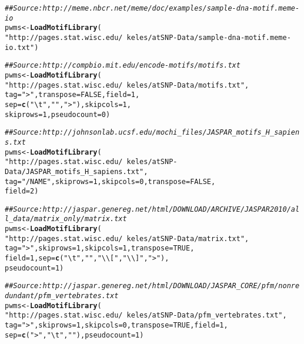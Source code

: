 \documentclass[a4paper,10pt]{article}\usepackage[]{graphicx}\usepackage[]{color}
\makeatletter
\newcommand{\hlnum}[1]{\textcolor[rgb]{0.686,0.059,0.569}{#1}}%
\newcommand{\hlstr}[1]{\textcolor[rgb]{0.192,0.494,0.8}{#1}}%
\newcommand{\hlcom}[1]{\textcolor[rgb]{0.678,0.584,0.686}{\textit{#1}}}%
\newcommand{\hlstd}[1]{\textcolor[rgb]{0.345,0.345,0.345}{#1}}%
\newcommand{\hlkwb}[1]{\textcolor[rgb]{0.69,0.353,0.396}{#1}}%
\newcommand{\hlkwc}[1]{\textcolor[rgb]{0.333,0.667,0.333}{#1}}%
\newcommand{\hlkwd}[1]{\textcolor[rgb]{0.737,0.353,0.396}{\textbf{#1}}}%
\newenvironment{kframe}{%
 \def\at@end@of@kframe{}%
 \ifinner\ifhmode%
  \def\at@end@of@kframe{\end{minipage}}%
  \begin{minipage}{\columnwidth}%
 \fi\fi%
 \def\FrameCommand##1{\hskip\@totalleftmargin \hskip-\fboxsep
 \colorbox{shadecolor}{##1}\hskip-\fboxsep
     \hskip-\linewidth \hskip-\@totalleftmargin \hskip\columnwidth}%
 \MakeFramed {\advance\hsize-\width
   \@totalleftmargin\z@ \linewidth\hsize
   \@setminipage}}%
 {\par\unskip\endMakeFramed%
 \at@end@of@kframe}
\newenvironment{knitrout}{}{} %
\makeatother
\begin{document}
\begin{knitrout}
\color{fgcolor}\begin{kframe}
\begin{alltt}
\hlcom{## Source: http://meme.nbcr.net/meme/doc/examples/sample-dna-motif.meme-io}
\hlstd{pwms} \hlkwb{<-} \hlkwd{LoadMotifLibrary}\hlstd{(}
 \hlstr{"http://pages.stat.wisc.edu/~keles/atSNP-Data/sample-dna-motif.meme-io.txt"}\hlstd{)}

\hlcom{## Source: http://compbio.mit.edu/encode-motifs/motifs.txt}
\hlstd{pwms} \hlkwb{<-} \hlkwd{LoadMotifLibrary}\hlstd{(}
 \hlstr{"http://pages.stat.wisc.edu/~keles/atSNP-Data/motifs.txt"}\hlstd{,}
 \hlkwc{tag} \hlstd{=} \hlstr{">"}\hlstd{,} \hlkwc{transpose} \hlstd{=} \hlnum{FALSE}\hlstd{,} \hlkwc{field} \hlstd{=} \hlnum{1}\hlstd{,}
 \hlkwc{sep} \hlstd{=} \hlkwd{c}\hlstd{(}\hlstr{"\textbackslash{}t"}\hlstd{,} \hlstr{" "}\hlstd{,} \hlstr{">"}\hlstd{),} \hlkwc{skipcols} \hlstd{=} \hlnum{1}\hlstd{,}
 \hlkwc{skiprows} \hlstd{=} \hlnum{1}\hlstd{,} \hlkwc{pseudocount} \hlstd{=} \hlnum{0}\hlstd{)}

\hlcom{## Source: http://johnsonlab.ucsf.edu/mochi_files/JASPAR_motifs_H_sapiens.txt}
\hlstd{pwms} \hlkwb{<-} \hlkwd{LoadMotifLibrary}\hlstd{(}
 \hlstr{"http://pages.stat.wisc.edu/~keles/atSNP-Data/JASPAR_motifs_H_sapiens.txt"}\hlstd{,}
 \hlkwc{tag} \hlstd{=} \hlstr{"/NAME"}\hlstd{,}\hlkwc{skiprows} \hlstd{=} \hlnum{1}\hlstd{,} \hlkwc{skipcols} \hlstd{=} \hlnum{0}\hlstd{,} \hlkwc{transpose} \hlstd{=} \hlnum{FALSE}\hlstd{,}
 \hlkwc{field} \hlstd{=} \hlnum{2}\hlstd{)}

\hlcom{## Source: http://jaspar.genereg.net/html/DOWNLOAD/ARCHIVE/JASPAR2010/all_data/matrix_only/matrix.txt}
\hlstd{pwms} \hlkwb{<-} \hlkwd{LoadMotifLibrary}\hlstd{(}
 \hlstr{"http://pages.stat.wisc.edu/~keles/atSNP-Data/matrix.txt"}\hlstd{,}
 \hlkwc{tag} \hlstd{=} \hlstr{">"}\hlstd{,} \hlkwc{skiprows} \hlstd{=} \hlnum{1}\hlstd{,} \hlkwc{skipcols} \hlstd{=} \hlnum{1}\hlstd{,} \hlkwc{transpose} \hlstd{=} \hlnum{TRUE}\hlstd{,}
 \hlkwc{field} \hlstd{=} \hlnum{1}\hlstd{,} \hlkwc{sep} \hlstd{=} \hlkwd{c}\hlstd{(}\hlstr{"\textbackslash{}t"}\hlstd{,} \hlstr{" "}\hlstd{,} \hlstr{"\textbackslash{}\textbackslash{}["}\hlstd{,} \hlstr{"\textbackslash{}\textbackslash{}]"}\hlstd{,} \hlstr{">"}\hlstd{),}
 \hlkwc{pseudocount} \hlstd{=} \hlnum{1}\hlstd{)}

\hlcom{## Source: http://jaspar.genereg.net/html/DOWNLOAD/JASPAR_CORE/pfm/nonredundant/pfm_vertebrates.txt}
\hlstd{pwms} \hlkwb{<-} \hlkwd{LoadMotifLibrary}\hlstd{(}
 \hlstr{"http://pages.stat.wisc.edu/~keles/atSNP-Data/pfm_vertebrates.txt"}\hlstd{,}
 \hlkwc{tag} \hlstd{=} \hlstr{">"}\hlstd{,} \hlkwc{skiprows} \hlstd{=} \hlnum{1}\hlstd{,} \hlkwc{skipcols} \hlstd{=} \hlnum{0}\hlstd{,} \hlkwc{transpose} \hlstd{=} \hlnum{TRUE}\hlstd{,} \hlkwc{field} \hlstd{=} \hlnum{1}\hlstd{,}
 \hlkwc{sep} \hlstd{=} \hlkwd{c}\hlstd{(}\hlstr{">"}\hlstd{,} \hlstr{"\textbackslash{}t"}\hlstd{,} \hlstr{" "}\hlstd{),} \hlkwc{pseudocount} \hlstd{=} \hlnum{1}\hlstd{)}


\end{alltt}
\end{kframe}
\end{knitrout}
\end{document}
